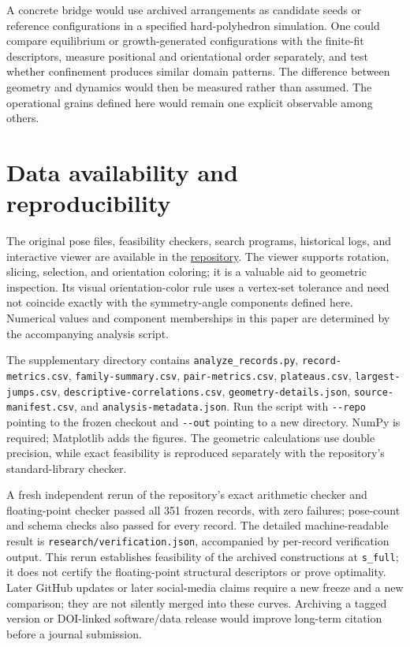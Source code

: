 \documentclass[11pt,a4paper]{article}
\begin{document}
A concrete bridge would use archived arrangements as candidate seeds or reference configurations in a specified hard-polyhedron simulation. One could compare equilibrium or growth-generated configurations with the finite-fit descriptors, measure positional and orientational order separately, and test whether confinement produces similar domain patterns. The difference between geometry and dynamics would then be measured rather than assumed. The operational grains defined here would remain one explicit observable among others.

\section{Data availability and reproducibility}

The original pose files, feasibility checkers, search programs, historical logs, and interactive viewer are available in the \href{https://github.com/alejandrozu/platonic-packing}{repository}. The viewer supports rotation, slicing, selection, and orientation coloring; it is a valuable aid to geometric inspection. Its visual orientation-color rule uses a vertex-set tolerance and need not coincide exactly with the symmetry-angle components defined here. Numerical values and component memberships in this paper are determined by the accompanying analysis script.

The supplementary directory contains \nolinkurl{analyze_records.py}, \nolinkurl{record-metrics.csv}, \nolinkurl{family-summary.csv}, \nolinkurl{pair-metrics.csv}, \nolinkurl{plateaus.csv}, \nolinkurl{largest-jumps.csv}, \nolinkurl{descriptive-correlations.csv}, \nolinkurl{geometry-details.json}, \nolinkurl{source-manifest.csv}, and \nolinkurl{analysis-metadata.json}. Run the script with \nolinkurl{--repo} pointing to the frozen checkout and \nolinkurl{--out} pointing to a new directory. NumPy is required; Matplotlib adds the figures. The geometric calculations use double precision, while exact feasibility is reproduced separately with the repository's standard-library checker.

A fresh independent rerun of the repository's exact arithmetic checker and floating-point checker passed all 351 frozen records, with zero failures; pose-count and schema checks also passed for every record. The detailed machine-readable result is \nolinkurl{research/verification.json}, accompanied by per-record verification output. This rerun establishes feasibility of the archived constructions at \nolinkurl{s_full}; it does not certify the floating-point structural descriptors or prove optimality. Later GitHub updates or later social-media claims require a new freeze and a new comparison; they are not silently merged into these curves. Archiving a tagged version or DOI-linked software/data release would improve long-term citation before a journal submission.
\end{document}
